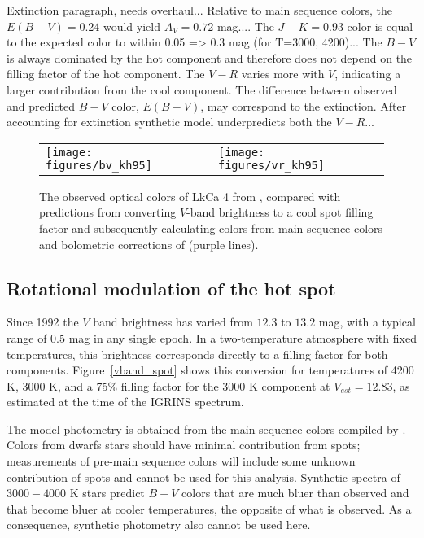 \documentclass[twocolumn]{emulateapj}%
\begin{document}
Extinction paragraph, needs overhaul...  Relative to main sequence colors, the $E(B-V)=0.24$ would yield $A_V=0.72$ mag....  
The $J-K=0.93$ color is equal to the expected color to within 0.05 => 0.3 mag (for T=3000, 4200)... The $B-V$ is always dominated by the hot component and therefore does not depend on the filling factor of the hot component.  The $V-R$ varies more with $V$, indicating a larger contribution from the cool component.  The difference between observed and predicted $B-V$ color, $E(B-V)$, may correspond to the extinction.  After accounting for extinction synthetic model underpredicts both the $V-R$...







\begin{figure*}
	\centering
	\begin{tabular}{ll}
	\texttt{[image: figures/bv\_kh95]} 
    &
    \texttt{[image: figures/vr\_kh95]}
    \end{tabular}
\caption{The observed optical colors of LkCa 4 from \citet{grankin08}, compared with predictions from converting $V$-band brightness to a cool spot filling factor and subsequently calculating colors from main sequence colors and bolometric corrections of \citet{kenyon95} (purple lines).}
\label{fig:colors}
\end{figure*}


\subsection{Rotational modulation of the hot spot}\label{sec:rotSpot}

Since 1992 the $V$ band brightness has varied from $12.3$ to $13.2$ mag, with a typical range of $0.5$ mag in any single epoch.  In a two-temperature atmosphere with fixed temperatures, this brightness corresponds directly to a filling factor for both components.  Figure~\ref{vband_spot} shows this conversion for temperatures of 4200 K, 3000 K, and a 75\% filling factor for the 3000 K component at $V_{est}=12.83$, as estimated at the time of the IGRINS spectrum.  

The model photometry is obtained from the main sequence colors compiled by \citet{kenyon95}.  Colors from dwarfs stars should have minimal contribution from spots; measurements of pre-main sequence colors will include some unknown contribution of spots and cannot be used for this analysis.  Synthetic spectra of $3000-4000$ K stars predict $B-V$ colors that are much bluer than observed and that become bluer at cooler temperatures, the opposite of what is observed.  As a consequence, synthetic photometry also cannot be used here.  
\end{document}
